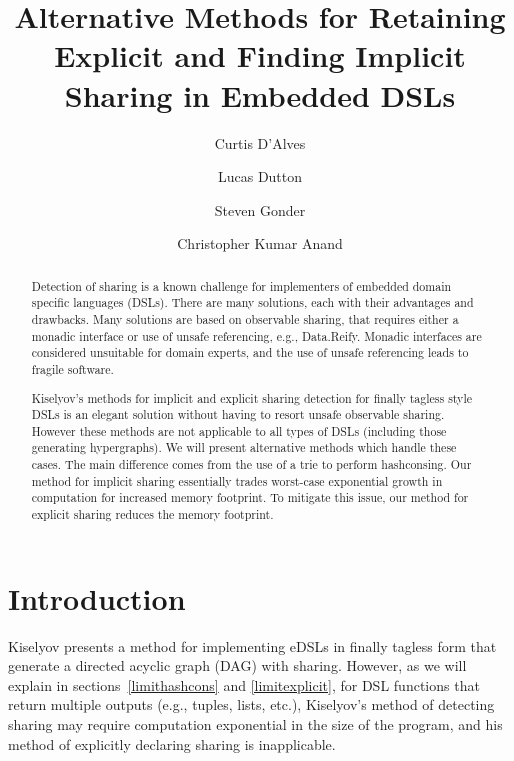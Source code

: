 \documentclass[runningheads]{llncs}
\begin{document}
\lstset{language=haskell}
%
\title{Alternative Methods for Retaining
    Explicit and Finding Implicit Sharing in Embedded DSLs}
%
%
\author{Curtis D'Alves \and
Lucas Dutton \and
Steven Gonder \and
Christopher Kumar Anand
}
%
%
%
\maketitle              %
%
\begin{abstract}
  Detection of sharing is a known challenge for implementers of embedded domain
  specific languages (DSLs). There are many solutions, each with their
  advantages and drawbacks. Many solutions are based on observable sharing, that
  requires either a monadic interface or use of unsafe referencing, e.g.,
  Data.Reify. Monadic interfaces are considered unsuitable for domain experts, and
  the use of unsafe referencing leads to fragile software.

  Kiselyov's methods for implicit and explicit sharing detection for finally
  tagless style DSLs is an elegant solution without having to resort unsafe
  observable sharing. However these methods are not applicable to all types of
  DSLs (including those generating hypergraphs). We will present alternative
  methods which handle these cases. The main difference comes from the use of a
  trie to perform hashconsing. Our method for implicit sharing essentially
  trades worst-case exponential growth in computation for increased memory
  footprint. To mitigate this issue, our method for explicit sharing reduces the
  memory footprint.

\end{abstract}
%
%
%
\section{Introduction}

Kiselyov \cite{kiselyov:sharing}  presents a method for implementing
eDSLs in finally tagless form that generate a directed acyclic graph (DAG) with
sharing. 
However, as we will explain in sections~\ref{limithashcons} and
\ref{limitexplicit}, for DSL functions that return multiple
outputs (e.g., tuples, lists, etc.), Kiselyov's method of detecting sharing may require computation exponential in the size of the program,
and his method of explicitly declaring sharing is inapplicable.
\end{document}
